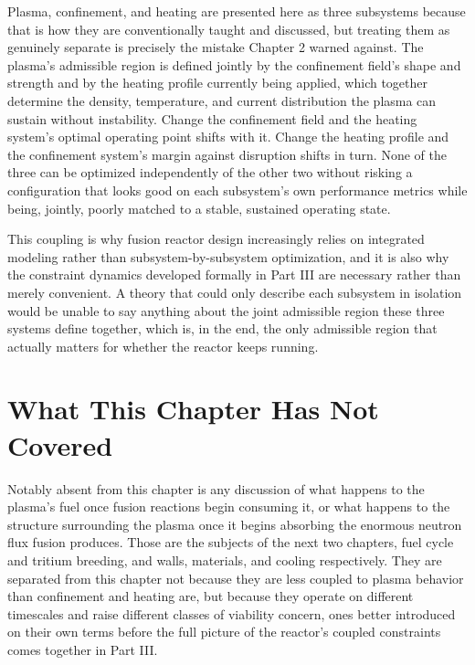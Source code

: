 Plasma, confinement, and heating are presented here as three subsystems because that is how they are conventionally taught and discussed, but treating them as genuinely separate is precisely the mistake Chapter 2 warned against. The plasma's admissible region is defined jointly by the confinement field's shape and strength and by the heating profile currently being applied, which together determine the density, temperature, and current distribution the plasma can sustain without instability. Change the confinement field and the heating system's optimal operating point shifts with it. Change the heating profile and the confinement system's margin against disruption shifts in turn. None of the three can be optimized independently of the other two without risking a configuration that looks good on each subsystem's own performance metrics while being, jointly, poorly matched to a stable, sustained operating state.

This coupling is why fusion reactor design increasingly relies on integrated modeling rather than subsystem-by-subsystem optimization, and it is also why the constraint dynamics developed formally in Part III are necessary rather than merely convenient. A theory that could only describe each subsystem in isolation would be unable to say anything about the joint admissible region these three systems define together, which is, in the end, the only admissible region that actually matters for whether the reactor keeps running.

\section{What This Chapter Has Not Covered}

Notably absent from this chapter is any discussion of what happens to the plasma's fuel once fusion reactions begin consuming it, or what happens to the structure surrounding the plasma once it begins absorbing the enormous neutron flux fusion produces. Those are the subjects of the next two chapters, fuel cycle and tritium breeding, and walls, materials, and cooling respectively. They are separated from this chapter not because they are less coupled to plasma behavior than confinement and heating are, but because they operate on different timescales and raise different classes of viability concern, ones better introduced on their own terms before the full picture of the reactor's coupled constraints comes together in Part III.
